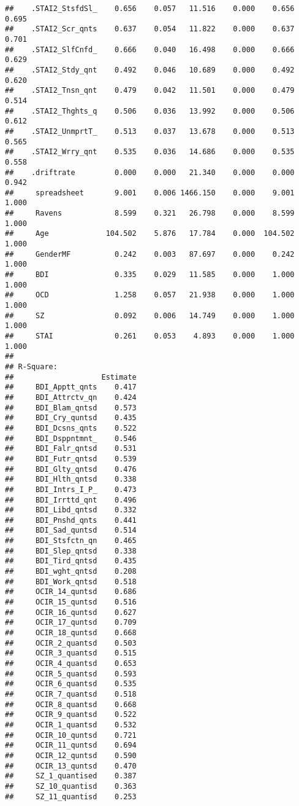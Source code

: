 \documentclass[]{article}
\begin{document}
\begin{verbatim}
##    .STAI2_StsfdSl_    0.656    0.057   11.516    0.000    0.656    0.695
##    .STAI2_Scr_qnts    0.637    0.054   11.822    0.000    0.637    0.701
##    .STAI2_SlfCnfd_    0.666    0.040   16.498    0.000    0.666    0.629
##    .STAI2_Stdy_qnt    0.492    0.046   10.689    0.000    0.492    0.620
##    .STAI2_Tnsn_qnt    0.479    0.042   11.501    0.000    0.479    0.514
##    .STAI2_Thghts_q    0.506    0.036   13.992    0.000    0.506    0.612
##    .STAI2_UnmprtT_    0.513    0.037   13.678    0.000    0.513    0.565
##    .STAI2_Wrry_qnt    0.535    0.036   14.686    0.000    0.535    0.558
##    .driftrate         0.000    0.000   21.340    0.000    0.000    0.942
##     spreadsheet       9.001    0.006 1466.150    0.000    9.001    1.000
##     Ravens            8.599    0.321   26.798    0.000    8.599    1.000
##     Age             104.502    5.876   17.784    0.000  104.502    1.000
##     GenderMF          0.242    0.003   87.697    0.000    0.242    1.000
##     BDI               0.335    0.029   11.585    0.000    1.000    1.000
##     OCD               1.258    0.057   21.938    0.000    1.000    1.000
##     SZ                0.092    0.006   14.749    0.000    1.000    1.000
##     STAI              0.261    0.053    4.893    0.000    1.000    1.000
## 
## R-Square:
##                    Estimate
##     BDI_Apptt_qnts    0.417
##     BDI_Attrctv_qn    0.424
##     BDI_Blam_qntsd    0.573
##     BDI_Cry_quntsd    0.435
##     BDI_Dcsns_qnts    0.522
##     BDI_Dsppntmnt_    0.546
##     BDI_Falr_qntsd    0.531
##     BDI_Futr_qntsd    0.539
##     BDI_Glty_qntsd    0.476
##     BDI_Hlth_qntsd    0.338
##     BDI_Intrs_I_P_    0.473
##     BDI_Irrttd_qnt    0.496
##     BDI_Libd_qntsd    0.332
##     BDI_Pnshd_qnts    0.441
##     BDI_Sad_quntsd    0.514
##     BDI_Stsfctn_qn    0.465
##     BDI_Slep_qntsd    0.338
##     BDI_Tird_qntsd    0.435
##     BDI_wght_qntsd    0.208
##     BDI_Work_qntsd    0.518
##     OCIR_14_quntsd    0.686
##     OCIR_15_quntsd    0.516
##     OCIR_16_quntsd    0.627
##     OCIR_17_quntsd    0.709
##     OCIR_18_quntsd    0.668
##     OCIR_2_quantsd    0.503
##     OCIR_3_quantsd    0.515
##     OCIR_4_quantsd    0.653
##     OCIR_5_quantsd    0.593
##     OCIR_6_quantsd    0.535
##     OCIR_7_quantsd    0.518
##     OCIR_8_quantsd    0.668
##     OCIR_9_quantsd    0.522
##     OCIR_1_quantsd    0.532
##     OCIR_10_quntsd    0.721
##     OCIR_11_quntsd    0.694
##     OCIR_12_quntsd    0.590
##     OCIR_13_quntsd    0.470
##     SZ_1_quantised    0.387
##     SZ_10_quantisd    0.363
##     SZ_11_quantisd    0.253

\end{verbatim}
\end{document}
